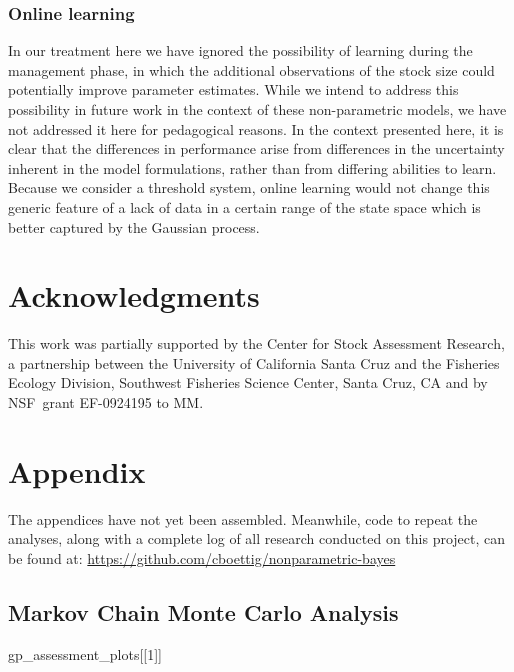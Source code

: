 \documentclass[author-year, review]{elsarticle} %
\newenvironment{Shaded}{}{}
\newcommand{\DecValTok}[1]{\textcolor[rgb]{0.25,0.63,0.44}{{#1}}}
\newcommand{\NormalTok}[1]{{#1}}
\begin{document}
\subsubsection{Online learning}

In our treatment here we have ignored the possibility of learning during
the management phase, in which the additional observations of the stock
size could potentially improve parameter estimates. While we intend to
address this possibility in future work in the context of these
non-parametric models, we have not addressed it here for pedagogical
reasons. In the context presented here, it is clear that the differences
in performance arise from differences in the uncertainty inherent in the
model formulations, rather than from differing abilities to learn.
Because we consider a threshold system, online learning would not change
this generic feature of a lack of data in a certain range of the state
space which is better captured by the Gaussian process.

\section{Acknowledgments}

This work was partially supported by the Center for Stock Assessment
Research, a partnership between the University of California Santa Cruz
and the Fisheries Ecology Division, Southwest Fisheries Science Center,
Santa Cruz, CA and by NSF~grant EF-0924195 to MM.

\section{Appendix}

The appendices have not yet been assembled. Meanwhile, code to repeat
the analyses, along with a complete log of all research conducted on
this project, can be found at:
\href{https://github.com/cboettig/nonparametric-bayes/}{https://github.com/cboettig/nonparametric-bayes}

\subsection{Markov Chain Monte Carlo Analysis}

\begin{Shaded}
\begin{Highlighting}[]
\NormalTok{gp_assessment_plots[[}\DecValTok{1}\NormalTok{]]}
\end{Highlighting}
\end{Shaded}
\end{document}
